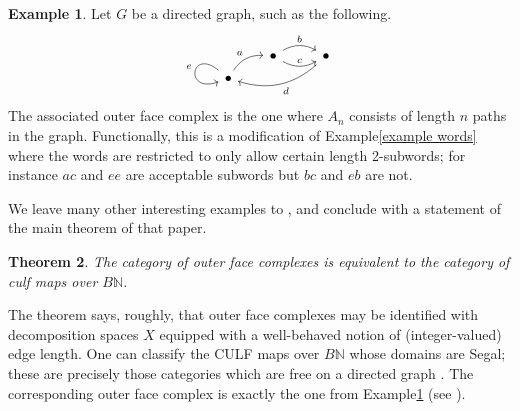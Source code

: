 \documentclass{amsart}
\newtheorem{theorem}{Theorem}[section]
\theoremstyle{definition}
\newtheorem{example}[theorem]{Example}
\newtheorem{exercise}[theorem]{Exercise}
\theoremstyle{remark}
\begin{document}
\begin{example}\label{ex dir graph}
Let $G$ be a directed graph, such as the following.
\[ \begin{tikzcd}[row sep=tiny]
&[-0.2cm] \bullet \rar[bend left,"b"] \rar[bend right,"c"] & \bullet \ar[lld, bend left, "d"]  \\
\bullet \ar[ur, bend left,"a"] \ar[in=200, out=140, loop,"e"']
\end{tikzcd} \]
The associated outer face complex is the one where $A_n$ consists of length $n$ paths in the graph.
Functionally, this is a modification of Example\nobreakspace \ref {example words} where the words are restricted to only allow certain length 2-subwords; for instance $ac$ and $ee$ are acceptable subwords but $bc$ and $eb$ are not.
\end{example}

We leave many other interesting examples to \cite{HackneyKock:FDS}, and conclude with a statement of the main theorem of that paper.

\begin{theorem}
The category of outer face complexes is equivalent to the category of culf maps over $B\mathbb{N}$.
\end{theorem}

The theorem says, roughly, that outer face complexes may be identified with decomposition spaces $X$ equipped with a well-behaved notion of (integer-valued) edge length.
One can classify the CULF maps over $B\mathbb{N}$ whose domains are Segal; these are precisely those categories which are free on a directed graph \cite[\S1]{Street:CS}.
The corresponding outer face complex is exactly the one from Example\nobreakspace \ref {ex dir graph} (see \cite[4.1]{HackneyKock:FDS}).

\end{document}
